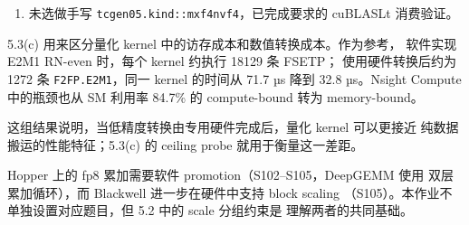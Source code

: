 \documentclass[11pt,a4paper,fontset=fandol]{ctexart}
\providecommand{\tightlist}{\setlength{\itemsep}{0pt}\setlength{\parskip}{0pt}}
\begin{document}
\begin{answer}
\begin{enumerate}
\def\labelenumi{(\alph{enumi})}
\setcounter{enumi}{3}
\tightlist
\item
  未选做手写
  \texttt{tcgen05.\allowbreak{}kind:\allowbreak{}:\allowbreak{}mxf4nvf4}，已完成要求的
  cuBLASLt 消费验证。
\end{enumerate}

\end{answer}

\begin{lookback}

5.3(c) 用来区分量化 kernel 中的访存成本和数值转换成本。作为参考，
软件实现 E2M1 RN-even 时，每个 kernel 约执行 18129 条 FSETP；
使用硬件转换后约为 1272 条 \texttt{F2FP.\allowbreak{}E2M1}，同一 kernel
的时间从 71.7 µs 降到 32.8 µs。Nsight Compute 中的瓶颈也从 SM 利用率
84.7\% 的 compute-bound 转为 memory-bound。

这组结果说明，当低精度转换由专用硬件完成后，量化 kernel 可以更接近
纯数据搬运的性能特征；5.3(c) 的 ceiling probe 就用于衡量这一差距。

Hopper 上的 fp8 累加需要软件 promotion（S102--S105，DeepGEMM 使用
双层累加循环），而 Blackwell 进一步在硬件中支持 block scaling
（S105）。本作业不单独设置对应题目，但 5.2 中的 scale 分组约束是
理解两者的共同基础。

\end{lookback}
\end{document}
